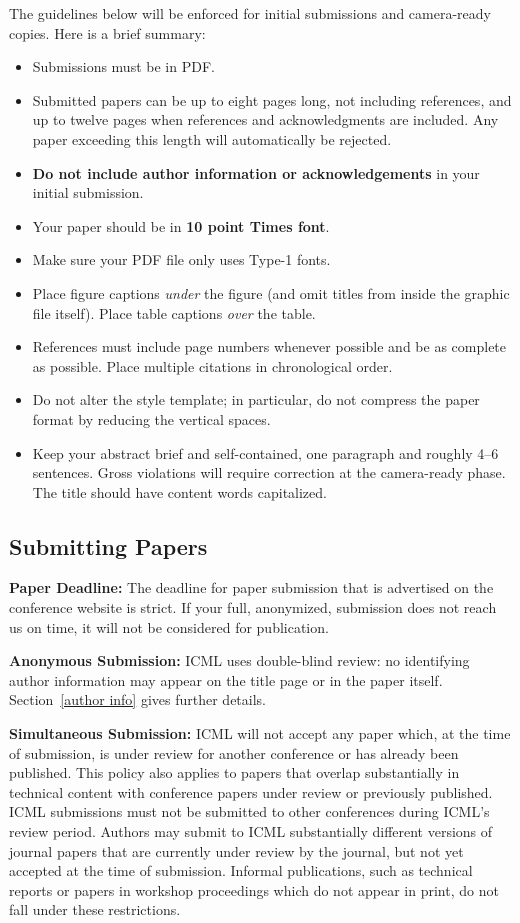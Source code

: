 \documentclass{article}
\begin{document}
The guidelines below will be enforced for initial submissions and
camera-ready copies. Here is a brief summary:
\begin{itemize}
\item Submissions must be in PDF\@.
\item Submitted papers can be up to eight pages long, not including references, and up to twelve pages when references and acknowledgments are included. Any paper exceeding this length will automatically be rejected. 
\item \textbf{Do not include author information or acknowledgements} in your
    initial submission.
\item Your paper should be in \textbf{10 point Times font}.
\item Make sure your PDF file only uses Type-1 fonts.
\item Place figure captions \emph{under} the figure (and omit titles from inside
    the graphic file itself). Place table captions \emph{over} the table.
\item References must include page numbers whenever possible and be as complete
    as possible. Place multiple citations in chronological order.
\item Do not alter the style template; in particular, do not compress the paper
    format by reducing the vertical spaces.
\item Keep your abstract brief and self-contained, one paragraph and roughly
    4--6 sentences. Gross violations will require correction at the
    camera-ready phase. The title should have content words capitalized.
\end{itemize}

\subsection{Submitting Papers}

\textbf{Paper Deadline:} The deadline for paper submission that is
advertised on the conference website is strict. If your full,
anonymized, submission does not reach us on time, it will not be
considered for publication. 

\textbf{Anonymous Submission:} ICML uses double-blind review: no identifying
author information may appear on the title page or in the paper
itself. Section~\ref{author info} gives further details.

\textbf{Simultaneous Submission:} ICML will not accept any paper which,
at the time of submission, is under review for another conference or
has already been published. This policy also applies to papers that
overlap substantially in technical content with conference papers
under review or previously published. ICML submissions must not be
submitted to other conferences during ICML's review period. Authors
may submit to ICML substantially different versions of journal papers
that are currently under review by the journal, but not yet accepted
at the time of submission. Informal publications, such as technical
reports or papers in workshop proceedings which do not appear in
print, do not fall under these restrictions.
\end{document}
